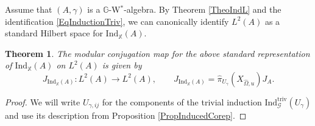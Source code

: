 \documentclass[reqno]{amsart}
\numberwithin{equation}{section}
\newtheorem{Theorem}{Theorem}[section]
\newcommand{\G}{\mathbb{G}}
\newcommand{\X}{\mathbb{X}}
\newcommand{\msG}{\mathscr{G}}
\newcommand{\Ind}{\mathrm{Ind}}
\newcommand{\triv}{\mathrm{triv}}
\begin{document}
Assume that $(A,\gamma)$ is a $\G$-W$^*$-algebra. By Theorem \ref{TheoIndL} and the identification \eqref{EqInductionTriv}, we can canonically identify $L^2(A)$ as a standard Hilbert space for $\Ind_{\X}(A)$.


\begin{Theorem}\label{TheoModConjGen}
The modular conjugation map for the above standard representation of $\Ind_{\X}(A)$ on $L^2(A)$ is given by 
\begin{equation}\label{EqInducedModCon}
J_{\Ind_{\X}(A)}\colon L^2(A) \rightarrow L^2(A),\qquad J_{\Ind_{\X}(A)} = \hat{\pi}_{U_{\gamma}}(X_{\hat{\Omega},u})J_A.
\end{equation}
\end{Theorem} 

\begin{proof}
We will write $U_{\gamma,ij}$ for the components of the trivial induction $\Ind_{\msG}^{\triv}(U_\gamma)$ and use its description from Proposition \ref{PropInducedCorep}.


\end{proof}
\end{document}
